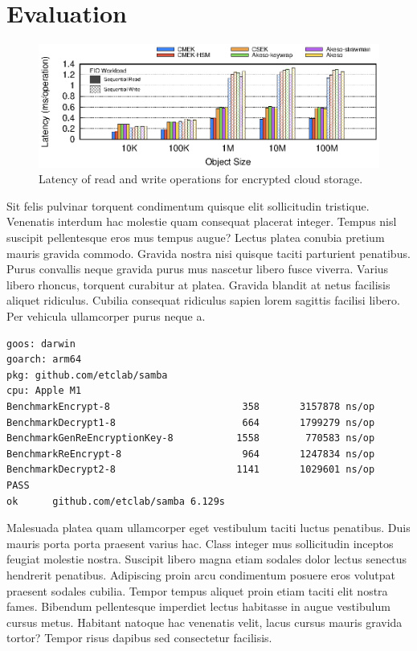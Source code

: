 \section{Evaluation}
\label{sec:evaluation}

\begin{figure}
    \centering
    \includegraphics[width=\textwidth]{figs/fsop-latency-hist-2col}
    \caption{Latency of read and write operations for encrypted cloud storage.}
    \label{fig:fsop-latency-hist-2col}
\end{figure}

Sit felis pulvinar torquent condimentum quisque elit sollicitudin tristique.
Venenatis interdum hac molestie quam consequat placerat integer. Tempus nisl
suscipit pellentesque eros mus tempus augue? Lectus platea conubia pretium
mauris gravida commodo. Gravida nostra nisi quisque taciti parturient
penatibus. Purus convallis neque gravida purus mus nascetur libero fusce
viverra. Varius libero rhoncus, torquent curabitur at platea. Gravida blandit
at netus facilisis aliquet ridiculus. Cubilia consequat ridiculus sapien lorem
sagittis facilisi libero. Per vehicula ullamcorper purus neque a.


{\footnotesize
\begin{verbatim}goos: darwin
goarch: arm64
pkg: github.com/etclab/samba
cpu: Apple M1
BenchmarkEncrypt-8              	     358	   3157878 ns/op
BenchmarkDecrypt1-8             	     664	   1799279 ns/op
BenchmarkGenReEncryptionKey-8   	    1558	    770583 ns/op
BenchmarkReEncrypt-8            	     964	   1247834 ns/op
BenchmarkDecrypt2-8             	    1141	   1029601 ns/op
PASS
ok  	github.com/etclab/samba	6.129s
\end{verbatim}
}

Malesuada platea quam ullamcorper eget vestibulum taciti luctus penatibus. Duis
mauris porta porta praesent varius hac. Class integer mus sollicitudin inceptos
feugiat molestie nostra. Suscipit libero magna etiam sodales dolor lectus
senectus hendrerit penatibus. Adipiscing proin arcu condimentum posuere eros
volutpat praesent sodales cubilia. Tempor tempus aliquet proin etiam taciti
elit nostra fames. Bibendum pellentesque imperdiet lectus habitasse in augue
vestibulum cursus metus. Habitant natoque hac venenatis velit, lacus cursus
mauris gravida tortor? Tempor risus dapibus sed consectetur facilisis.


